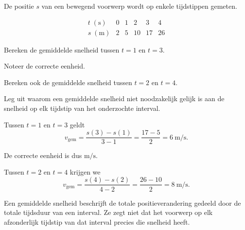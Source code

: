 \documentclass{ximera}
\begin{document}
\begin{oefening}{\oefB\ESS}

De positie $s$ van een bewegend voorwerp wordt op enkele tijdstippen
gemeten.

\[
\begin{array}{c|ccccc}
t\;(\mathrm{s}) & 0 & 1 & 2 & 3 & 4\\ \hline
s\;(\mathrm{m}) & 2 & 5 & 10 & 17 & 26
\end{array}
\]

\begin{question}
Bereken de gemiddelde snelheid tussen $t=1$ en $t=3$.
\end{question}

\begin{question}
Noteer de correcte eenheid.
\end{question}

\begin{question}
Bereken ook de gemiddelde snelheid tussen $t=2$ en $t=4$.
\end{question}

\begin{question}
Leg uit waarom een gemiddelde snelheid niet noodzakelijk gelijk is
aan de snelheid op elk tijdstip van het onderzochte interval.
\end{question}

\begin{oplossing}

Tussen $t=1$ en $t=3$ geldt
\[
v_{\mathrm{gem}}
=
\frac{s(3)-s(1)}{3-1}
=
\frac{17-5}{2}
=
6\ \mathrm{m/s}.
\]

De correcte eenheid is dus $\mathrm{m/s}$.

Tussen $t=2$ en $t=4$ krijgen we
\[
v_{\mathrm{gem}}
=
\frac{s(4)-s(2)}{4-2}
=
\frac{26-10}{2}
=
8\ \mathrm{m/s}.
\]

Een gemiddelde snelheid beschrijft de totale positieverandering gedeeld
door de totale tijdsduur van een interval. Ze zegt niet dat het voorwerp
op elk afzonderlijk tijdstip van dat interval precies die snelheid heeft.

\end{oplossing}

\end{oefening}


\end{document}

